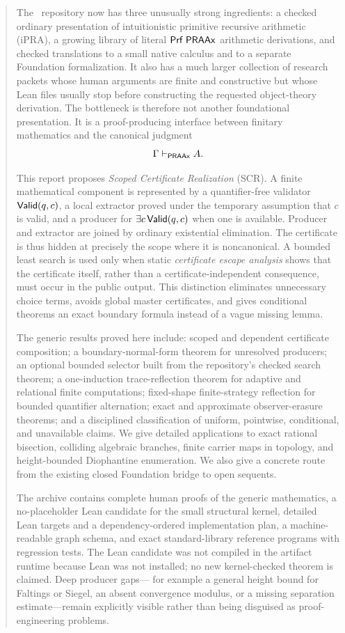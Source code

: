 \begin{abstract}
The \repo\ repository now has three unusually strong ingredients: a checked
ordinary presentation of intuitionistic primitive recursive arithmetic
(iPRA), a growing library of literal \(\Prf\;\PRAAx\) arithmetic derivations,
and checked translations to a small native calculus and to a separate
Foundation formalization.  It also has a much larger collection of research
packets whose human arguments are finite and constructive but whose Lean files
usually stop before constructing the requested object-theory derivation.
The bottleneck is therefore not another foundational presentation.  It is a
proof-producing interface between finitary mathematics and the canonical
judgment
\[
        \Gamma\turnstile A.
\]

This report proposes \emph{Scoped Certificate Realization} (SCR).  A finite
mathematical component is represented by a quantifier-free validator
\(\Valid(q,c)\), a local extractor proved under the temporary assumption that
\(c\) is valid, and a producer for \(\exists c\,\Valid(q,c)\) when one is
available.  Producer and extractor are joined by ordinary existential
elimination.  The certificate is thus hidden at precisely the scope where it
is noncanonical.  A bounded least search is used only when static
\emph{certificate escape analysis} shows that the certificate itself, rather
than a certificate-independent consequence, must occur in the public output.
This distinction eliminates unnecessary choice terms, avoids global master
certificates, and gives conditional theorems an exact boundary formula instead
of a vague missing lemma.

The generic results proved here include: scoped and dependent certificate
composition; a boundary-normal-form theorem for unresolved producers; an
optional bounded selector built from the repository's checked search theorem;
a one-induction trace-reflection theorem for adaptive and relational finite
computations; fixed-shape finite-strategy reflection for bounded quantifier
alternation; exact and approximate observer-erasure theorems; and a disciplined
classification of uniform, pointwise, conditional, and unavailable claims.
We give detailed applications to exact rational bisection, colliding algebraic
branches, finite carrier maps in topology, and height-bounded Diophantine
enumeration.  We also give a concrete route from the existing closed
Foundation bridge to open sequents.

The archive contains complete human proofs of the generic mathematics, a
no-placeholder Lean candidate for the small structural kernel, detailed Lean
targets and a dependency-ordered implementation plan, a machine-readable graph
schema, and exact standard-library reference programs with regression tests.
The Lean candidate was not compiled in the artifact runtime because Lean was
not installed; no new kernel-checked theorem is claimed.  Deep producer gaps---
for example a general height bound for Faltings or Siegel, an absent convergence
modulus, or a missing separation estimate---remain explicitly visible rather
than being disguised as proof-engineering problems.
\end{abstract}

